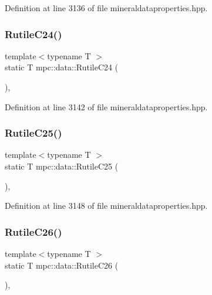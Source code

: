 Definition at line 3136 of file mineraldataproperties.\+hpp.

\mbox{\label{namespacempc_1_1data_ade68205729af73507492aca8fc941d5b}} 
\subsubsection{\texorpdfstring{Rutile\+C24()}{RutileC24()}}
{\footnotesize\ttfamily template$<$typename T $>$ \\
static T mpc\+::data\+::\+Rutile\+C24 (\begin{DoxyParamCaption}{ }\end{DoxyParamCaption})\hspace{0.3cm}{\ttfamily [inline]}, {\ttfamily [static]}}



Definition at line 3142 of file mineraldataproperties.\+hpp.

\mbox{\label{namespacempc_1_1data_a84a379b68d6a1c781f661ae0358475fa}} 
\subsubsection{\texorpdfstring{Rutile\+C25()}{RutileC25()}}
{\footnotesize\ttfamily template$<$typename T $>$ \\
static T mpc\+::data\+::\+Rutile\+C25 (\begin{DoxyParamCaption}{ }\end{DoxyParamCaption})\hspace{0.3cm}{\ttfamily [inline]}, {\ttfamily [static]}}



Definition at line 3148 of file mineraldataproperties.\+hpp.

\mbox{\label{namespacempc_1_1data_abe937921a65b0efe4b06a8f0b7ef9220}} 
\subsubsection{\texorpdfstring{Rutile\+C26()}{RutileC26()}}
{\footnotesize\ttfamily template$<$typename T $>$ \\
static T mpc\+::data\+::\+Rutile\+C26 (\begin{DoxyParamCaption}{ }\end{DoxyParamCaption})\hspace{0.3cm}{\ttfamily [inline]}, {\ttfamily [static]}}




